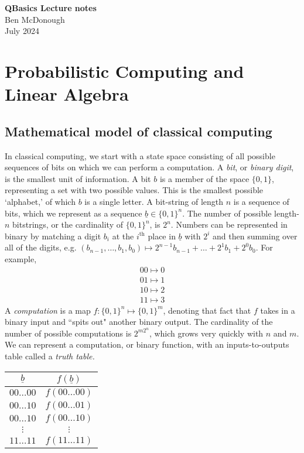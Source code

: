 \documentclass{article}
\author{Ben McDonough}
\date{July 2024}
\begin{document}
\begin{center}
\Large{\textbf{QBasics Lecture notes}} \\
\normalsize{Ben McDonough} \\
July 2024
\end{center}

\section{Probabilistic Computing and Linear Algebra}
\subsection{Mathematical model of classical computing}
In classical computing, we start with a state space consisting of all possible sequences of bits on which we can perform a computation. A \textit{bit}, or \textit{binary digit}, is the smallest unit of information. A bit $b$ is a member of the space $\{0,1\}$, representing a set with two possible values. This is the smallest possible `alphabet,' of which $b$ is a single letter. A bit-string of length $n$ is a sequence of bits, which we represent as a sequence $\underline b \in \{0,1\}^{n}$. The number of possible length-$n$ bitstrings, or the cardinality of $\{0,1\}^{n}$, is $2^n$. Numbers can be represented in binary by matching a digit $b_i$ at the $i^\text{th}$ place in $\underline b$ with $2^i$ and then summing over all of the digits, e.g. $(b_{n-1}, \dots, b_1, b_0) \mapsto 2^{n-1}b_{n-1} + \dots + 2^1b_1 + 2^0 b_0$. For example,
\begin{align*}
00 \mapsto 0 \\
01 \mapsto 1 \\
10 \mapsto 2 \\
11 \mapsto 3
\end{align*}
A \textit{computation} is a map $f:\{0,1\}^n \mapsto \{0,1\}^{m}$, denoting that fact that $f$ takes in a binary input and ``spits out" another binary output. The cardinality of the number of possible computations is $2^{m2^n}$, which grows very quickly with $n$ and $m$. We can represent a computation, or binary function, with an inputs-to-outputs table called a \textit{truth table.} 
\begin{table}[hbt!]
    \centering
    \begin{tabular}{c|c}
         $\underline b$ & $f(\underline b)$ \\
         \hline
         $00\dots 00$ & $f(00\dots 00)$ \\
         $00\dots 10$ & $f(00\dots 01)$ \\
         $00\dots 10$ & $f(00\dots 10)$\\
         $\vdots$ & $\vdots$ \\
         $11\dots 11$ & $f(11\dots 11)$\\
    \end{tabular}
\end{table}
\end{document}
